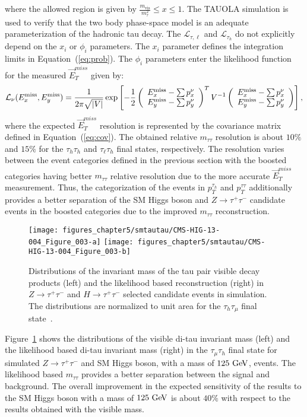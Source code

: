where the allowed region is given by $\frac{m_{\mathrm{vis}}}{m_{\tau}^2}\leq x \leq 1$. The TAUOLA simulation is used to verify that the two body phase-space model is an adequate parameterization of the hadronic tau decay. The $\mathcal{L}_{\tau,\ell}$  and $\mathcal{L}_{\tau_{h}}$  do not explicitly depend on the $x_i$ or $\phi_i$ parameters. The $x_i$ parameter defines the integration limits in Equation~(\ref{eq:prob}). The $\phi_i$ parameters enter the likelihood function for the measured $\vec{E}_{T}^{miss}$ given by:
\begin{equation}
\mathcal{L}_{\nu} (E_{x}^{\rm miss}, E_{y}^{\rm miss}) = \frac{1}{2 \pi \sqrt{\vert V \vert}} 
 \exp \left[ -\frac{1}{2}
 \left( \begin{array}{c} E_{x}^{\rm miss} - \sum p_{x}^{\nu} \\ E_{y}^{\rm miss} - \sum p_{y}^{\nu} \end{array} \right)^{T}
 V^{-1} 
 \left( \begin{array}{c} E_{x}^{\rm miss} - \sum p_{x}^{\nu} \\ E_{y}^{\rm miss} - \sum p_{y}^{\nu} \end{array} \right)
\right],
\end{equation}
where the expected $\vec{E}_{T}^{miss}$ resolution is represented by the covariance matrix defined in Equation~(\ref{eq:cov}). The obtained relative $m_{\tau\tau}$ resolution is about $10\%$ and $15\%$ for the $\tau_h\tau_h$ and $\tau_{\ell}\tau_h$ final states, respectively. The resolution varies between the event categories defined in the previous section with the boosted categories having better $m_{\tau\tau}$ relative resolution due to the more accurate $\vec{E}_{T}^{miss}$ measurement. Thus, the categorization of the events in $p_{T}^{\tau_h}$ and  $p_{T}^{\tau\tau}$ additionally provides a better separation of the SM Higgs boson and $Z\rightarrow \tau^{+}\tau^{-}$ candidate events in the boosted categories due to the improved $m_{\tau\tau}$ reconstruction.   
\begin{figure}[htbp]
\centering
\texttt{[image: figures\_chapter5/smtautau/CMS-HIG-13-004\_Figure\_003-a]}
\texttt{[image: figures\_chapter5/smtautau/CMS-HIG-13-004\_Figure\_003-b]}
\caption{Distributions of the invariant mass of the tau pair visible decay products (left) and the likelihood based reconstruction (right) in $Z \rightarrow \tau^{+}\tau^{-}$ and $H \rightarrow \tau^{+}\tau^{-}$ selected candidate events in simulation. The distributions are normalized to unit area for the $\tau_{h}\tau_{\mu}$ final state~\cite{Chatrchyan:2014nva}.}
\label{fig:svfit}
\end{figure}
Figure~\ref{fig:svfit} shows the distributions of the visible di-tau invariant mass (left) and the likelihood based di-tau invariant mass (right) in the $\tau_{\mu}\tau_h$ final state for simulated $Z \rightarrow \tau^{+}\tau^{-}$ and SM Higgs boson, with a mass of $125~\mathrm{Ge\kern -0.1em V}$, events. The likelihood based $m_{\tau\tau}$ provides a better separation between the signal and background. The overall improvement in the expected sensitivity of the results to the SM Higgs boson with a mass of $125~\mathrm{Ge\kern -0.1em V}$ is about $40\%$ with respect to the results obtained with the visible mass.  

